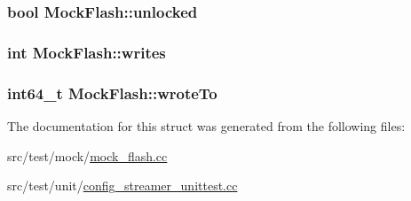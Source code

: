 \hypertarget{structMockFlash_a6aabd2652225b8cef0cd4c22eb23b971}{
\subsubsection[{unlocked}]{\setlength{\rightskip}{0pt plus 5cm}bool Mock\+Flash\+::unlocked}}\label{structMockFlash_a6aabd2652225b8cef0cd4c22eb23b971}
\hypertarget{structMockFlash_ac495930be3e839f785226c3b0723e979}{
\subsubsection[{writes}]{\setlength{\rightskip}{0pt plus 5cm}int Mock\+Flash\+::writes}}\label{structMockFlash_ac495930be3e839f785226c3b0723e979}
\hypertarget{structMockFlash_a79fba38bdcda21429f6ec6f4716cdcfd}{
\subsubsection[{wrote\+To}]{\setlength{\rightskip}{0pt plus 5cm}int64\+\_\+t Mock\+Flash\+::wrote\+To}}\label{structMockFlash_a79fba38bdcda21429f6ec6f4716cdcfd}


The documentation for this struct was generated from the following files\+:\begin{DoxyCompactItemize}
\item 
src/test/mock/\hyperlink{mock__flash_8cc}{mock\+\_\+flash.\+cc}\item 
src/test/unit/\hyperlink{config__streamer__unittest_8cc}{config\+\_\+streamer\+\_\+unittest.\+cc}\end{DoxyCompactItemize}
